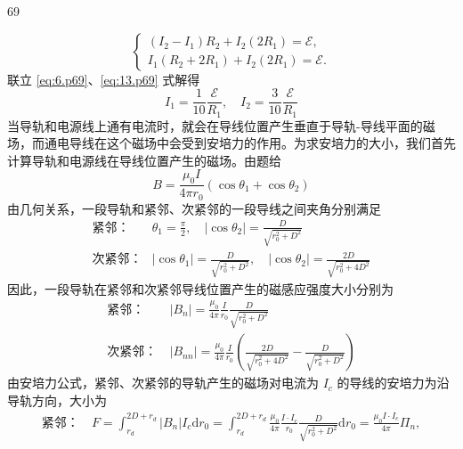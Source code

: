 \begin{solution}{69}
\begin{subsolution}
\begin{equation}
            \begin{cases}
                (I_{2} - I_{1}) R_{2} + I_{2} (2R_{1}) = \mathcal{E}, \\
                I_{1} (R_{2} + 2R_{1}) + I_{2} (2R_{1}) = \mathcal{E}.
            \end{cases} \label{eq:13.p69}
        \end{equation}
        联立 \eqref{eq:6.p69}、\eqref{eq:13.p69} 式解得
        \begin{equation}
            I_{1} = \frac{1}{10} \frac{\mathcal{E}}{R_{1}}, \quad I_{2} = \frac{3}{10} \frac{\mathcal{E}}{R_{1}} \label{eq:14.p69}
        \end{equation}
        当导轨和电源线上通有电流时，就会在导线位置产生垂直于导轨-导线平面的磁场，而通电导线在这个磁场中会受到安培力的作用。为求安培力的大小，我们首先计算导轨和电源线在导线位置产生的磁场。由题给
        \begin{equation*}
            B = \frac{\mu_{0} I}{4\pi r_{0}} (\cos\theta_{1} + \cos\theta_{2})
        \end{equation*}
        由几何关系，一段导轨和紧邻、次紧邻的一段导线之间夹角分别满足
        \begin{align*}
            \text{紧邻：} &\theta_{1} = \frac{\pi}{2},\quad |\cos\theta_{2}| = \frac{D}{\sqrt{r_{0}^{2} + D^{2}}} \\
            \text{次紧邻：} &|\cos\theta_{1}| = \frac{D}{\sqrt{r_{0}^{2} + D^{2}}},\quad |\cos\theta_{2}| = \frac{2D}{\sqrt{r_{0}^{2} + 4D^{2}}}
        \end{align*}
        因此，一段导轨在紧邻和次紧邻导线位置产生的磁感应强度大小分别为
        \begin{align}
            \text{紧邻：} &\ |B_{n}| = \frac{\mu_{0}}{4\pi} \frac{I}{r_{0}} \frac{D}{\sqrt{r_{0}^{2} + D^{2}}} \nonumber \\
            \text{次紧邻：} &\ |B_{nn}| = \frac{\mu_{0}}{4\pi} \frac{I}{r_{0}} \left( \frac{2D}{\sqrt{r_{0}^{2} + 4D^{2}}} - \frac{D}{\sqrt{r_{0}^{2} + D^{2}}} \right) \label{eq:15.p69}
        \end{align}
        由安培力公式，紧邻、次紧邻的导轨产生的磁场对电流为 $I_{c}$ 的导线的安培力为沿导轨方向，大小为
        \begin{align}
            \text{紧邻：} &\ F = \int_{r_{d}}^{2D+r_{d}} |B_{n}| I_{c} \mathrm{d}r_{0} = \int_{r_{d}}^{2D+r_{d}} \frac{\mu_{0}}{4\pi} \frac{I \cdot I_{c}}{r_{0}} \frac{D}{\sqrt{r_{0}^{2} + D^{2}}} \mathrm{d}r_{0} = \frac{\mu_{0} I \cdot I_{c}}{4\pi} \Pi_{n}, \nonumber \\

\end{align}
\end{subsolution}
\end{solution}
